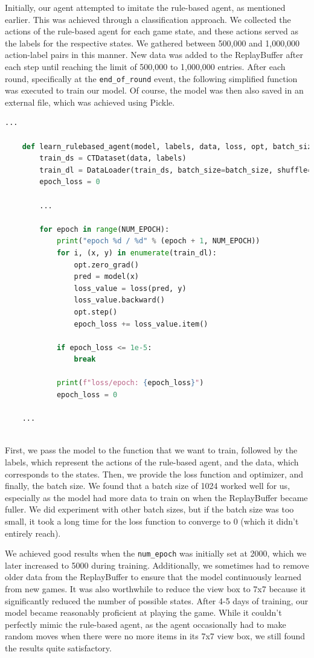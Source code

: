 Initially, our agent attempted to imitate the rule-based agent, as mentioned earlier. This was achieved through a classification approach. 
We collected the actions of the rule-based agent for each game state, and these actions served as the labels for the respective states. 
We gathered between 500,000 and 1,000,000 action-label pairs in this manner.
New data was added to the ReplayBuffer after each step until reaching the limit of 500,000 to 1,000,000 entries. 
After each round, specifically at the \verb|end_of_round| event, the following simplified function was executed to train our model.
Of course, the model was then also saved in an external file, which was achieved using Pickle.

\begin{lstlisting}[language=Python]
    ...
    
    def learn_rulebased_agent(model, labels, data, loss, opt, batch_size):
        train_ds = CTDataset(data, labels)
        train_dl = DataLoader(train_ds, batch_size=batch_size, shuffle=True)
        epoch_loss = 0

        ...

        for epoch in range(NUM_EPOCH):
            print("epoch %d / %d" % (epoch + 1, NUM_EPOCH))
            for i, (x, y) in enumerate(train_dl):
                opt.zero_grad()
                pred = model(x)
                loss_value = loss(pred, y) 
                loss_value.backward() 
                opt.step()
                epoch_loss += loss_value.item() 

            if epoch_loss <= 1e-5:
                break

            print(f"loss/epoch: {epoch_loss}")
            epoch_loss = 0      

    ...
    
\end{lstlisting}

First, we pass the model to the function that we want to train, followed by the labels, 
which represent the actions of the rule-based agent, and the data, which corresponds to the states. 
Then, we provide the loss function and optimizer, and finally, the batch size. We found that a batch size of 1024 worked well for us, 
especially as the model had more data to train on when the ReplayBuffer became fuller. We did experiment with other batch sizes,
but if the batch size was too small, it took a long time for the loss function to converge to 0 (which it didn't entirely reach).

We achieved good results when the \verb|num_epoch| was initially set at 2000, which we later increased to 5000 during training. 
Additionally, we sometimes had to remove older data from the ReplayBuffer to ensure that the model continuously learned from new games. 
It was also worthwhile to reduce the view box to 7x7 because it significantly reduced the number of possible states. 
After 4-5 days of training, our model became reasonably proficient at playing the game. While it couldn't perfectly mimic the rule-based agent, 
as the agent occasionally had to make random moves when there were no more items in its 7x7 view box, we still found the results quite satisfactory.


